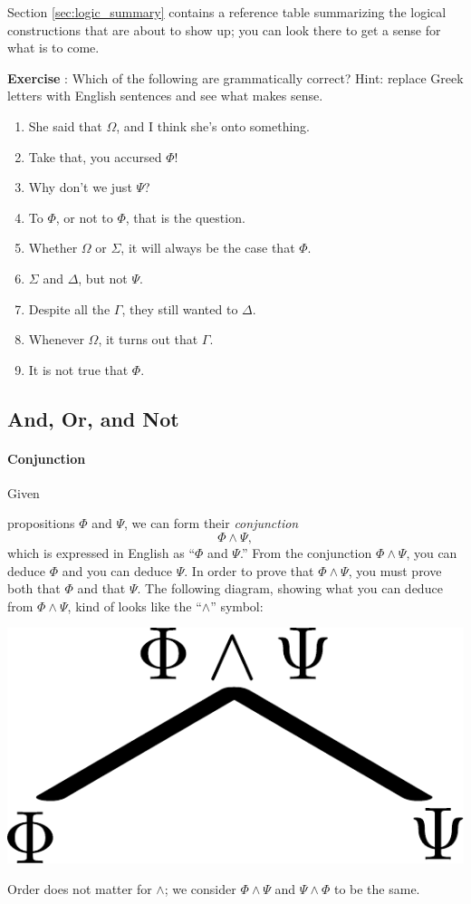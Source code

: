 \documentclass[12pt]{article}
\newcommand{\AND}{\wedge}
\newcounter{exercise}
\def\putExerciseHeading{\refstepcounter{exercise} \textbf{Exercise \theexercise}}
\newcommand{\ex}[1]{ \putExerciseHeading: #1}
\def\pA{\Phi}
\def\pB{\Psi}
\def\pC{\Omega}
\def\pD{\Sigma}
\def\pE{\Gamma}
\def\pF{\Delta}
\begin{document}
Section \ref{sec:logic_summary}
contains a reference table summarizing the logical constructions that are about to show up;
you can look there to get a sense for what is to come.

\ex{
Which of the following are grammatically correct? Hint: replace Greek letters with English sentences and see what makes sense.
\begin{enumerate}
\item She said that $\pC$, and I think she's onto something.
\item Take that, you accursed $\pA$!
\item Why don't we just $\pB$?
\item To $\pA$, or not to $\pA$, that is the question.
\item Whether $\pC$ or $\pD$, it will always be the case that $\pA$.
\item $\pD$ and $\pF$, but not $\pB$.
\item Despite all the $\pE$, they still wanted to $\pF$.
\item Whenever $\pC$, it turns out that $\pE$.
\item It is not true that $\pA$.
\end{enumerate}
}



\subsection{And, Or, and Not}

\paragraph{Conjunction}
\hypertarget{hl:AND}{Given} propositions $\pA$ and $\pB$, we can form their \emph{conjunction}
$$
\pA \AND \pB,
$$
which is expressed in English as ``$\pA$ and $\pB$.''
\hypertarget{hl:ANDUSE}{From} the conjunction $\pA\AND\pB$, you can deduce $\pA$ and you can deduce $\pB$.
\hypertarget{hl:ANDPV}{In} order to prove that $\pA\AND\pB$, you must prove both that $\pA$ and that $\pB$.
The following diagram, showing what you can deduce from $\pA\AND\pB$, kind of looks like the ``$\AND$'' symbol:
\begin{center}\includegraphics[scale=0.5]{img/andDiagram.pdf}\end{center}
Order does not matter for $\AND$; we consider $\pA\AND\pB$ and $\pB\AND\pA$ to be the same.
\end{document}
